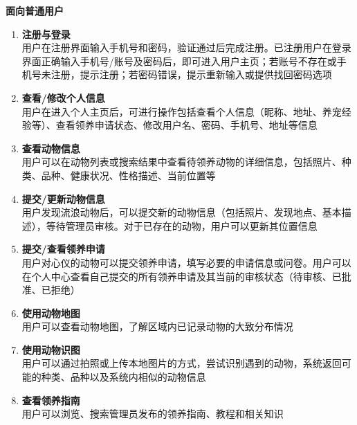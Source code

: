 \documentclass[12pt,a4paper,UTF8]{article}
\begin{document}
\noindent\textbf{面向普通用户}
\begin{enumerate}
    \item \textbf{注册与登录} \\
    用户在注册界面输入手机号和密码，验证通过后完成注册。已注册用户在登录界面正确输入手机号/账号及密码后，即可进入用户主页；若账号不存在或手机号未注册，提示注册；若密码错误，提示重新输入或提供找回密码选项
    \item \textbf{查看/修改个人信息} \\
    用户在进入个人主页后，可进行操作包括查看个人信息（昵称、地址、养宠经验等）、查看领养申请状态、修改用户名、密码、手机号、地址等信息
    \item \textbf{查看动物信息} \\
    用户可以在动物列表或搜索结果中查看待领养动物的详细信息，包括照片、种类、品种、健康状况、性格描述、当前位置等
    \item \textbf{提交/更新动物信息} \\
    用户发现流浪动物后，可以提交新的动物信息（包括照片、发现地点、基本描述），等待管理员审核。对于已存在的动物，用户可以更新其位置信息
    \item \textbf{提交/查看领养申请} \\
    用户对心仪的动物可以提交领养申请，填写必要的申请信息或问卷。用户可以在个人中心查看自己提交的所有领养申请及其当前的审核状态（待审核、已批准、已拒绝）
    \item \textbf{使用动物地图} \\
    用户可以查看动物地图，了解区域内已记录动物的大致分布情况
    \item \textbf{使用动物识图} \\
    用户可以通过拍照或上传本地图片的方式，尝试识别遇到的动物，系统返回可能的种类、品种以及系统内相似的动物信息
    \item \textbf{查看领养指南} \\
    用户可以浏览、搜索管理员发布的领养指南、教程和相关知识
\end{enumerate}

\vspace{0.5cm}
\end{document}
